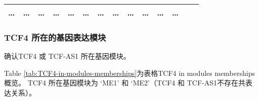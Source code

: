 \documentclass[
]{article}
\begin{document}
\begin{longtable}[]{@{}llllllllllllll@{}}
\begin{minipage}[t]{0.04\columnwidth}
\ldots{}\strut
\end{minipage} & \begin{minipage}[t]{0.04\columnwidth}\raggedright
\ldots{}\strut
\end{minipage} & \begin{minipage}[t]{0.05\columnwidth}\raggedright
\ldots{}\strut
\end{minipage} & \begin{minipage}[t]{0.05\columnwidth}\raggedright
\ldots{}\strut
\end{minipage} & \begin{minipage}[t]{0.03\columnwidth}\raggedright
\ldots{}\strut
\end{minipage} & \begin{minipage}[t]{0.05\columnwidth}\raggedright
\ldots{}\strut
\end{minipage} & \begin{minipage}[t]{0.05\columnwidth}\raggedright
\ldots{}\strut
\end{minipage} & \begin{minipage}[t]{0.05\columnwidth}\raggedright
\ldots{}\strut
\end{minipage} & \begin{minipage}[t]{0.05\columnwidth}\raggedright
\ldots{}\strut
\end{minipage} & \begin{minipage}[t]{0.05\columnwidth}\raggedright
\ldots{}\strut
\end{minipage} & \begin{minipage}[t]{0.05\columnwidth}\raggedright
\ldots{}\strut
\end{minipage} & \begin{minipage}[t]{0.02\columnwidth}\raggedright
\ldots{}\strut
\end{minipage}\tabularnewline
\bottomrule
\end{longtable}

\hypertarget{tcf4-ux6240ux5728ux7684ux57faux56e0ux8868ux8fbeux6a21ux5757}{%
\subsubsection{TCF4 所在的基因表达模块}\label{tcf4-ux6240ux5728ux7684ux57faux56e0ux8868ux8fbeux6a21ux5757}}

确认TCF4 或 TCF-AS1 所在基因模块。

Table \ref{tab:TCF4-in-modules-memberships}为表格TCF4 in modules memberships概览。
TCF4 所在基因模块为 `ME1' 和 `ME2'（TCF4 和 TCF-AS1不存在共表达关系）。
\end{document}
